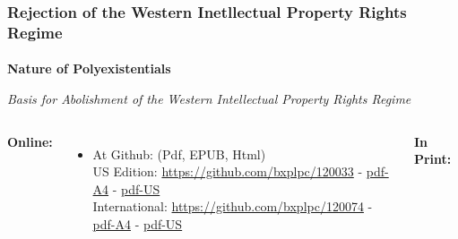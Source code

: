 \begin{frame}[fragile,plain,label=rejectingIpr]
    \frametitle{Rejection of the Western Inetllectual Property Rights Regime}
    \framesubtitle{}

    \addtolength{\leftmargini}{\labelsep}



\begin{center}
\textbf{Nature of Polyexistentials}
\end{center}


\begin{center}
  {\textit{Basis for Abolishment of the Western Intellectual Property Rights Regime}}
\end{center}


\begin{small}
\begin{columns}[T]

\begin{center}
        \colorbox{blue!30}{\color{black} \textbf{Online:}}
\end{center}

\begin{itemize}
      \item At Github: (Pdf, EPUB, Html) \\
      US Edition:   \url{https://github.com/bxplpc/120033} - \href{https://github.com/bxplpc/120033/blob/main/pdf/c-120033-1_05-book-a4-col-emb-pub.pdf}{pdf-A4} -
      \href{https://github.com/bxplpc/120033/blob/main/pdf/c-120033-1_05-book-8.5x11-col-emb-pub.pdf}{pdf-US}\\
      International: \url{https://github.com/bxplpc/120074} - \href{https://github.com/bxplpc/120074/blob/main/pdf/c-120074-1_05-book-a4-col-emb-pub.pdf}{pdf-A4} -   \href{https://github.com/bxplpc/120074/blob/main/pdf/c-120074-1_05-book-8.5x11-col-emb-pub.pdf}{pdf-US}\\
    \end{itemize}


   \begin{center}
      \colorbox{blue!60}{\color{white} \textbf{In Print:}}
    \end{center}


\end{columns}
\end{small}
\end{frame}
